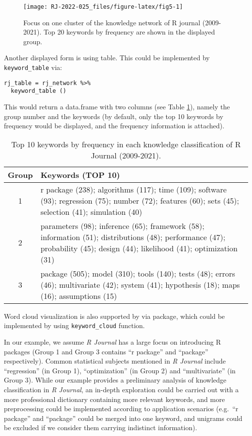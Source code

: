 \begin{figure}

{\centering \texttt{[image: RJ-2022-025\_files/figure-latex/fig5-1]} 

}

\caption{Focus on one cluster of the knowledge network of R journal (2009-2021). Top 20 keywords by frequency are shown in the displayed group.}\label{fig:fig5}
\end{figure}

Another displayed form is using table. This could be implemented by \texttt{keyword\_table} via:

\begin{verbatim}
rj_table = rj_network %>% 
  keyword_table () 
\end{verbatim}

This would return a data.frame with two columns (see Table \ref{tab:tab2-2}), namely the group number and the keywords (by default, only the top 10 keywords by frequency would be displayed, and the frequency information is attached).

\begin{table}

\caption{\label{tab:tab2-2}Top 10 keywords by frequency in each knowledge classification of R Journal (2009-2021).}
\centering
\fontsize{7}{9}\selectfont
\begin{tabular}[t]{c|>{\centering\arraybackslash}p{10cm}}
\hline
Group & Keywords (TOP 10)\\
\hline
1 & r package (238); algorithms (117); time (109); software (93); regression (75); number (72); features (60); sets (45); selection (41); simulation (40)\\
\hline
2 & parameters (98); inference (65); framework (58); information (51); distributions (48); performance (47); probability (45); design (44); likelihood (41); optimization (31)\\
\hline
3 & package (505); model (310); tools (140); tests (48); errors (46); multivariate (42); system (41); hypothesis (18); maps (16); assumptions (15)\\
\hline
\end{tabular}
\end{table}

Word cloud visualization is also supported by  via  package, which could be implemented by using \texttt{keyword\_cloud} function.

In our example, we assume \emph{R Journal} has a large focus on introducing R packages (Group 1 and Group 3 contains ``r package'' and ``package'' respectively). Common statistical subjects mentioned in \emph{R Journal} include ``regression'' (in Group 1), ``optimization'' (in Group 2) and ``multivariate'' (in Group 3). While our example provides a preliminary analysis of knowledge classification in \emph{R Journal}, an in-depth exploration could be carried out with a more professional dictionary containing more relevant keywords, and more preprocessing could be implemented according to application scenarios (e.g.~``r package'' and ``package'' could be merged into one keyword, and unigrams could be excluded if we consider them carrying indistinct information).

